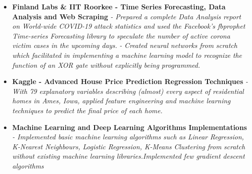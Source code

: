 \documentclass{article}
\begin{document}
\begin{itemize}
    \item{\textbf{\large{Finland Labs \& IIT Roorkee - Time Series Forecasting, Data Analysis and Web Scraping}}}
          \newline
          \textit{- Prepared a complete Data Analysis report on World-wide COVID-19 attack statistics and used the Facebook's fbprophet Time-series Forecasting library to speculate the number of active corona victim cases in the upcoming days.}\newline
          \textit{- Created neural networks from scratch which facilitated in implementing a machine learning model to recognize the function of an XOR gate without explicitly being programmed.}%

    \item{\textbf{\large{Kaggle - Advanced House Price Prediction Regression Techniques}}}
          \newline
          \textit{-With 79 explanatory variables describing (almost) every aspect of residential homes in Ames, Iowa, applied feature engineering and machine learning techniques to predict the final price of each home.}
    \item{\textbf{\large{Machine Learning and Deep Learning Algorithms Implementations}}}
          \newline
          \textit{- Implemented basic machine learning algorithms such as Linear Regression, K-Nearest Neighbours, Logistic Regression, K-Means Clustering from scratch without existing machine learning libraries.Implemented few gradient descent algorithms
          }
          \newline




\end{itemize}
\end{document}
